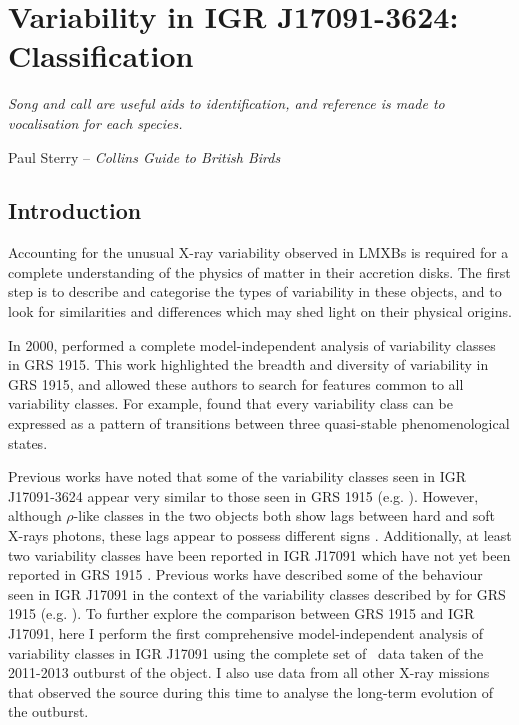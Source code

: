 \chapter{Variability in IGR J17091-3624: Classification}

\epigraph{\textit{Song and call are useful aids to identification, and reference is made to vocalisation for each species.}}{Paul Sterry -- \textit{Collins Guide to British Birds}}

\section{Introduction}

\par Accounting for the unusual X-ray variability observed in LMXBs is required for a complete understanding of the physics of matter in their accretion disks.  The first step is to describe and categorise the types of variability in these objects, and to look for similarities and differences which may shed light on their physical origins.
\par In 2000, \citeauthor{Belloni_GRS_MI} performed a complete model-independent analysis of variability classes in GRS 1915.  This work highlighted the breadth and diversity of variability in GRS 1915, and allowed these authors to search for features common to all variability classes.  For example, \citet{Belloni_GRS_MI} found that every variability class can be expressed as a pattern of transitions between three quasi-stable phenomenological states.
\par Previous works have noted that some of the variability classes seen in IGR J17091-3624 appear very similar to those seen in GRS 1915 (e.g. \citealp{Altamirano_IGR_FH, Zhang_IGR}).  However, although $\rho$-like classes in the two objects both show lags between hard and soft X-rays photons, these lags appear to possess different signs \citep{Altamirano_IGR_FH}.  Additionally, at least two variability classes have been reported in IGR J17091 which have not yet been reported in GRS 1915 \citep{Pahari_IGRClasses}.  Previous works have described some of the behaviour seen in IGR J17091 in the context of the variability classes described by \citealt{Belloni_GRS_MI} for GRS 1915 (e.g. \citealp{Altamirano_IGR_FH,Pahari_RhoDiff}).  To further explore the comparison between GRS 1915 and IGR J17091, here I perform the first comprehensive model-independent analysis of variability classes in IGR J17091 using the complete set of \rxte\ data taken of the 2011-2013 outburst of the object.  I also use data from all other X-ray missions that observed the source during this time to analyse the long-term evolution of the outburst.

